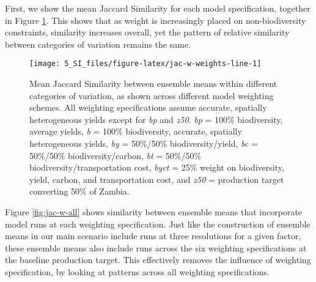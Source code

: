 \documentclass[
]{article}
\begin{document}
First, we show the mean Jaccard Similarity for each model specification, together in Figure \ref{fig:jac-w-weights-line}. This shows that as weight is increasingly placed on non-biodiversity constraints, similarity increases overall, yet the pattern of relative similarity between categories of variation remains the same.















\begin{figure}
\texttt{[image: 5\_SI\_files/figure-latex/jac-w-weights-line-1]} \caption{Mean Jaccard Similarity between ensemble means within different categories of variation, as shown across different model weighting schemes. All weighting specifications assume accurate, spatially heterogeneous yields except for \emph{bp} and \emph{z50}. \emph{bp} = 100\% biodiversity, average yields, \emph{b} = 100\% biodiversity, accurate, spatially heterogeneous yields, \emph{by} = 50\%/50\% biodiversity/yield, \emph{bc} = 50\%/50\% biodiversity/carbon, \emph{bt} = 50\%/50\% biodiversity/transportation cost, \emph{byct} = 25\% weight on biodiversity, yield, carbon, and transportation cost, and \emph{z50} = production target converting 50\% of Zambia.}\label{fig:jac-w-weights-line}
\end{figure}

Figure \ref{fig:jac-w-all} shows similarity between ensemble means that incorporate model runs at each weighting specification. Just like the construction of ensemble means in our main scenario include runs at three resolutions for a given factor, these ensemble means also include runs across the six weighting specifications at the baseline production target. This effectively removes the influence of weighting specification, by looking at patterns across all weighting specifications.
\end{document}
